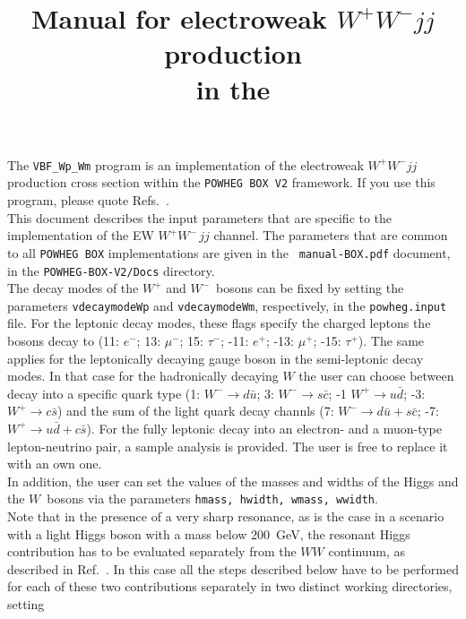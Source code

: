 \documentclass[a4paper,11pt]{article}
\title{Manual for electroweak $W^+W^- jj$ production \\
in the \POWHEGBOXT{}}
\date{}
\newcommand\POWHEGBOX{{\tt POWHEG~BOX}}
\def\wpm{W^+W^-}
\def\pboxtwo{{\tt POWHEG~BOX~V2}}
\begin{document}
\maketitle
%
\noindent
The {\tt VBF\_Wp\_Wm} program is an implementation of the electroweak
$W^+W^- jj$ production cross section within the \pboxtwo{} framework. 
If you use this program, please quote
Refs.~\cite{Jager:2006zc,JZ,Alioli:2010xd}.
\\[2ex]
This document describes the input parameters that are specific to the
implementation of the EW $\wpm\,jj$ channel.  The parameters that are
common to all {\tt POWHEG BOX} implementations are given in the {\tt
  manual-BOX.pdf} document, in the {\tt POWHEG-BOX-V2/Docs} directory.
\\[2ex]
The decay modes of the $W^+$ and $W^-$~bosons can be fixed by setting
the parameters {\tt vdecaymodeWp} and {\tt vdecaymodeWm},
respectively, in the {\tt powheg.input} file. For the leptonic decay
modes, these flags specify the charged leptons the bosons decay to
(11: $e^-$; 13: $\mu^-$; 15: $\tau^-$; -11: $e^+$; -13: $\mu^+$; -15:
$\tau^+$). The same applies for the leptonically decaying gauge boson
in the semi-leptonic decay modes. In that case for the hadronically
decaying $W$ the user can choose between decay into a specific quark
type (1: $W^-\to d\bar u$; 3: $W^-\to s\bar c$; -1 $W^+\to u\bar d$;
-3: $W^+\to c\bar s$) and the sum of the light quark decay channls (7:
$W^-\to d\bar u + s\bar c$; -7: $W^+\to u\bar d + c\bar s$). 
%
For the fully leptonic decay into an electron- and a muon-type lepton-neutrino pair, a sample analysis is provided. The user is free to replace it with an own one. 
\\[2ex]
In addition, the user can set the values of the masses and widths of
the Higgs and the $W$~bosons via the parameters {\tt hmass, hwidth,
  wmass, wwidth}.
\\[2ex]
Note that 
in the presence of a very sharp resonance, as is the case in a
scenario with a light Higgs boson with a mass below 200~GeV, the
resonant Higgs contribution has to be evaluated separately from the
$WW$ continuum, as described in Ref.~\cite{JZ}. In this case all the
steps described below have to be performed for each of these two
contributions separately in two distinct working directories, setting
\\[2ex]
\end{document}
